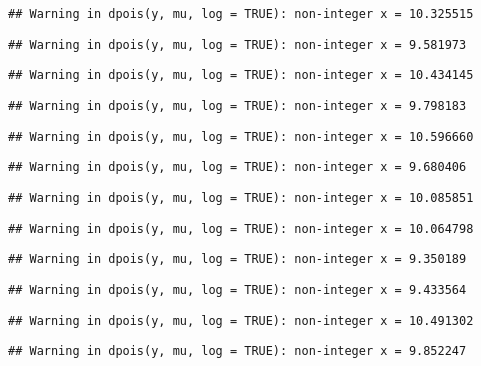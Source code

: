 \documentclass[
]{article}
\begin{document}
\begin{verbatim}
## Warning in dpois(y, mu, log = TRUE): non-integer x = 10.325515
\end{verbatim}

\begin{verbatim}
## Warning in dpois(y, mu, log = TRUE): non-integer x = 9.581973
\end{verbatim}

\begin{verbatim}
## Warning in dpois(y, mu, log = TRUE): non-integer x = 10.434145
\end{verbatim}

\begin{verbatim}
## Warning in dpois(y, mu, log = TRUE): non-integer x = 9.798183
\end{verbatim}

\begin{verbatim}
## Warning in dpois(y, mu, log = TRUE): non-integer x = 10.596660
\end{verbatim}

\begin{verbatim}
## Warning in dpois(y, mu, log = TRUE): non-integer x = 9.680406
\end{verbatim}

\begin{verbatim}
## Warning in dpois(y, mu, log = TRUE): non-integer x = 10.085851
\end{verbatim}

\begin{verbatim}
## Warning in dpois(y, mu, log = TRUE): non-integer x = 10.064798
\end{verbatim}

\begin{verbatim}
## Warning in dpois(y, mu, log = TRUE): non-integer x = 9.350189
\end{verbatim}

\begin{verbatim}
## Warning in dpois(y, mu, log = TRUE): non-integer x = 9.433564
\end{verbatim}

\begin{verbatim}
## Warning in dpois(y, mu, log = TRUE): non-integer x = 10.491302
\end{verbatim}

\begin{verbatim}
## Warning in dpois(y, mu, log = TRUE): non-integer x = 9.852247
\end{verbatim}
\end{document}
